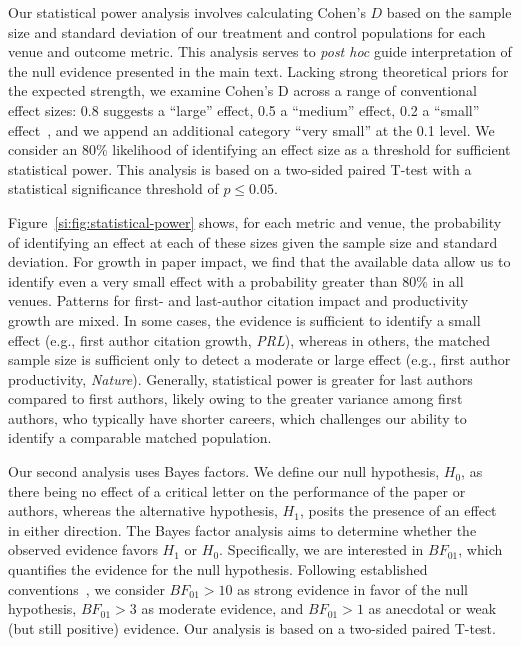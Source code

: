 \documentclass[12pt]{article} %
\begin{document}
Our statistical power analysis involves calculating Cohen's $D$ based on the sample size and standard deviation of our treatment and control populations for each venue and outcome metric. 
This analysis serves to \textit{post hoc} guide interpretation of the null evidence presented in the main text.
Lacking strong theoretical priors for the expected strength, we examine Cohen's D across a range of conventional effect sizes:
0.8 suggests a ``large'' effect, 0.5 a ``medium'' effect, 0.2 a ``small'' effect~\cite{Cohen1992}, and we append an additional category ``very small'' at the 0.1 level.
We consider an 80\% likelihood of identifying an effect size as a threshold for sufficient statistical power. 
This analysis is based on a two-sided paired T-test with a statistical significance threshold of $p \leq 0.05$. 


Figure~\ref{si:fig:statistical-power} shows, for each metric and venue, the probability of identifying an effect at each of these sizes given the sample size and standard deviation. For growth in paper impact, we find that the available data allow us to identify even a very small effect with a probability greater than 80\% in all venues.
Patterns for first- and last-author citation impact and productivity growth are mixed. 
In some cases, the evidence is sufficient to identify a small effect (e.g., first author citation growth, \textit{PRL}), whereas in others, the matched sample size is sufficient only to detect a moderate or large effect (e.g., first author productivity, \textit{Nature}). Generally, statistical power is greater for last authors compared to first authors, likely owing to the greater variance among first authors, who typically have shorter careers, which challenges our ability to identify a comparable matched population.

Our second analysis uses Bayes factors. We define our null hypothesis, $H_0$, as there being no effect of a critical letter on the performance of the paper or authors, whereas the alternative hypothesis, $H_1$, posits the presence of an effect in either direction. 
The Bayes factor analysis aims to determine whether the observed evidence favors $H_1$ or $H_0$. 
Specifically, we are interested in $BF_{01}$, which quantifies the evidence for the null hypothesis. 
Following established conventions~\cite{jeffreys1961theory}, we consider $BF_{01} > 10$ as strong evidence in favor of the null hypothesis, $BF_{01} > 3$ as moderate evidence, and $BF_{01} > 1$ as anecdotal or weak (but still positive) evidence.
Our analysis is based on a two-sided paired T-test.
\end{document}
